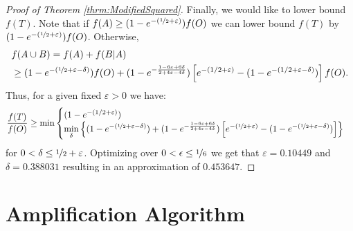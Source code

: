 \documentclass[a4paper]{article}
\begin{document}
\begin{proof}[Proof of Theorem \ref{thrm:ModifiedSquared}]
Finally, we would like to lower bound $f(T)$.
Note that if $f(A) \geq (1 - e^{-(\nicefrac[]{1}{2} + \varepsilon)})f(O)$ we can lower bound $f(T)$ by $(1 - e^{-(\nicefrac[]{1}{2} + \varepsilon)})f(O)$.
Otherwise,
\begin{align}
	&f(A \cup B)
	 = \nonumber
	f(A) + f(B|A)
	\\ & \geq
	(1-e^{-(\nicefrac[]{1}{2} + \varepsilon - \delta)})f(O)
	+
	(1-e^{-\frac{1-6\varepsilon+6\delta}{2+4\varepsilon-4\delta}})
	\left[
	e^{-(1/2 + \varepsilon)}
	- (1 - e^{-(1/2 + \varepsilon - \delta)})
	\right] f(O).
\end{align}
Thus, for a given fixed $\varepsilon > 0$ we have:
\begin{equation}
	\frac{f(T)}{f(O)} \geq  \min \begin{cases}
		(1 - e^{-(1/2 + \varepsilon)})
		\\
			\displaystyle{\min_{\delta}}\left\{
			(1-e^{-(\nicefrac[]{1}{2} + \varepsilon - \delta)})
			+
			(1-e^{-\frac{1-6\varepsilon+6\delta}{2+4\varepsilon-4\delta}})
			\left[
			e^{-(\nicefrac[]{1}{2} + \varepsilon)}
			- (1 - e^{-(\nicefrac[]{1}{2} + \varepsilon - \delta)})
			\right]\right\}
	\end{cases}
\end{equation}
for $0 < \delta \leq \nicefrac[]{1}{2} + \varepsilon$.
Optimizing over $0 < \epsilon \leq \nicefrac[]{1}{6}$ we get that $\varepsilon = 0.10449$ and $\delta = 0.388031$ resulting in an approximation of $0.453647$.
\end{proof}


\section{Amplification Algorithm}\label{sec:Amplification}
\def\pLarge{P_{\text{large}}}
\def\pVal{P_{\text{val}}}
\def\MGreedy{Modified$^2$Greedy}
\def\BOTAlg{BestOfThree}
\def\mA{\mathcal{A}}
\end{document}

